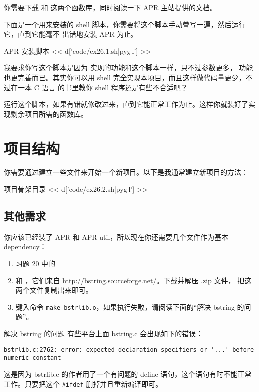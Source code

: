 你需要下载  和  这两个函数库，同时阅读一下
\href{http://apr.apache.org/}{APR 主站}提供的文档。

下面是一个用来安装的 shell 脚本，你需要将这个脚本手动誊写一遍，然后运行它，直到它能毫不
出错地安装 APR 为止。

\begin{code}{APR 安装脚本}
<< d['code/ex26.1.sh|pyg|l'] >>
\end{code}

我要求你写这个脚本是因为  实现的功能和这个脚本一样，只不过参数更多，
功能也更完善而已。其实你可以用 shell 完全实现本项目，而且这样做代码量更少，不过在一本 C 语言
的书里教你 shell 程序还是有些不合适吧？

运行这个脚本，如果有错就修改过来，直到它能正常工作为止。这样你就装好了实现剩余项目所需的函数库。

\section{项目结构}

你需要通过建立一些文件来开始一个新项目。以下是我通常建立新项目的方法：

\begin{code}{项目骨架目录}
<< d['code/ex26.2.sh|pyg|l'] >>
\end{code}

\subsection{其他需求}

 你应该已经装了 APR 和 APR-util，所以现在你还需要几个文件作为基本 dependency：

\begin{enumerate}
\item 习题 20 中的 
\item {} 和 ，它们来自 \href{http://bstring.sourceforge.net/}{http://bstring.sourceforge.net/}。下载并解压 .zip 文件，
把这两个文件复制出来即可。
\item 键入命令 \verb|make bstrlib.o|，如果执行失败，请阅读下面的“解决 bstring 的问题”。
\end{enumerate}

\begin{aside}{解决 bstring 的问题}
有些平台上面 bstring.c 会出现如下的错误：

\begin{lstlisting}
bstrlib.c:2762: error: expected declaration specifiers or '...' before numeric constant
\end{lstlisting}

这是因为 bstrlib.c 的作者用了一个有问题的 define 语句，这个语句有时不能正常工作。只要把这个 
\verb|#ifdef| 删掉并且重新编译即可。
\end{aside}

